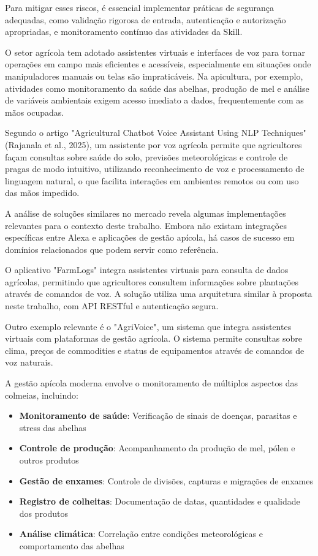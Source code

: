 Para mitigar esses riscos, é essencial implementar práticas de segurança adequadas, como validação rigorosa de entrada, 
autenticação e autorização apropriadas, e monitoramento contínuo das atividades da Skill.



O setor agrícola tem adotado assistentes virtuais e interfaces de voz para tornar operações em campo mais eficientes e acessíveis, especialmente em situações onde manipuladores manuais ou telas são impraticáveis. Na apicultura, por exemplo, atividades como monitoramento da saúde das abelhas, produção de mel e análise de variáveis ambientais exigem acesso imediato a dados, frequentemente com as mãos ocupadas.

Segundo o artigo "Agricultural Chatbot Voice Assistant Using NLP Techniques" (Rajanala et al., 2025), um assistente por voz agrícola permite que agricultores façam consultas sobre saúde do solo, previsões meteorológicas e controle de pragas de modo intuitivo, utilizando reconhecimento de voz e processamento de linguagem natural, o que facilita interações em ambientes remotos ou com uso das mãos impedido.

A análise de soluções similares no mercado revela algumas implementações relevantes para o contexto deste trabalho. Embora não existam integrações específicas entre Alexa e aplicações de gestão apícola, há casos de sucesso em domínios relacionados que podem servir como referência.

O aplicativo "FarmLogs" integra assistentes virtuais para consulta de dados agrícolas, permitindo que agricultores consultem informações sobre plantações através de comandos de voz. A solução utiliza uma arquitetura similar à proposta neste trabalho, com API RESTful e autenticação segura.

Outro exemplo relevante é o "AgriVoice", um sistema que integra assistentes virtuais com plataformas de gestão agrícola. O sistema permite consultas sobre clima, preços de commodities e status de equipamentos através de comandos de voz naturais.


A gestão apícola moderna envolve o monitoramento de múltiplos aspectos das colmeias, incluindo:
\begin{itemize}
    \item \textbf{Monitoramento de saúde}: Verificação de sinais de doenças, parasitas e stress das abelhas
    \item \textbf{Controle de produção}: Acompanhamento da produção de mel, pólen e outros produtos
    \item \textbf{Gestão de enxames}: Controle de divisões, capturas e migrações de enxames
    \item \textbf{Registro de colheitas}: Documentação de datas, quantidades e qualidade dos produtos
    \item \textbf{Análise climática}: Correlação entre condições meteorológicas e comportamento das abelhas
\end{itemize}

